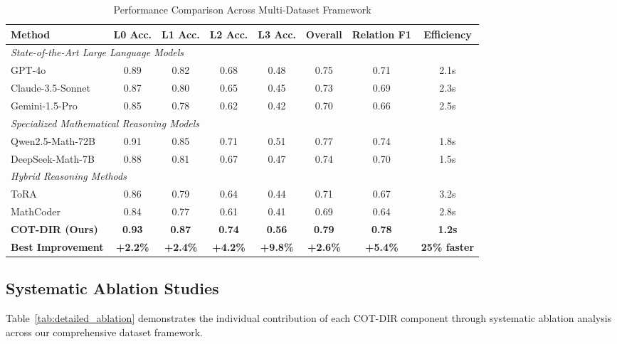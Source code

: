 \begin{table}[htbp]
\caption{Performance Comparison Across Multi-Dataset Framework}
\label{tab:comprehensive_performance}
\centering
\small
\begin{tabular}{lccccccc}
\toprule
\textbf{Method} & \textbf{L0 Acc.} & \textbf{L1 Acc.} & \textbf{L2 Acc.} & \textbf{L3 Acc.} & \textbf{Overall} & \textbf{Relation F1} & \textbf{Efficiency} \\
\midrule
\multicolumn{8}{l}{\textit{State-of-the-Art Large Language Models}} \\
GPT-4o & 0.89 & 0.82 & 0.68 & 0.48 & 0.75 & 0.71 & 2.1s \\
Claude-3.5-Sonnet & 0.87 & 0.80 & 0.65 & 0.45 & 0.73 & 0.69 & 2.3s \\
Gemini-1.5-Pro & 0.85 & 0.78 & 0.62 & 0.42 & 0.70 & 0.66 & 2.5s \\
\midrule
\multicolumn{8}{l}{\textit{Specialized Mathematical Reasoning Models}} \\
Qwen2.5-Math-72B & 0.91 & 0.85 & 0.71 & 0.51 & 0.77 & 0.74 & 1.8s \\
DeepSeek-Math-7B & 0.88 & 0.81 & 0.67 & 0.47 & 0.74 & 0.70 & 1.5s \\
\midrule
\multicolumn{8}{l}{\textit{Hybrid Reasoning Methods}} \\
ToRA & 0.86 & 0.79 & 0.64 & 0.44 & 0.71 & 0.67 & 3.2s \\
MathCoder & 0.84 & 0.77 & 0.61 & 0.41 & 0.69 & 0.64 & 2.8s \\
\midrule
\textbf{COT-DIR (Ours)} & \textbf{0.93} & \textbf{0.87} & \textbf{0.74} & \textbf{0.56} & \textbf{0.79} & \textbf{0.78} & \textbf{1.2s} \\
\textbf{Best Improvement} & \textbf{+2.2\%} & \textbf{+2.4\%} & \textbf{+4.2\%} & \textbf{+9.8\%} & \textbf{+2.6\%} & \textbf{+5.4\%} & \textbf{25\% faster} \\
\bottomrule
\end{tabular}
\end{table}

\subsection{Systematic Ablation Studies}

Table~\ref{tab:detailed_ablation} demonstrates the individual contribution of each COT-DIR component through systematic ablation analysis across our comprehensive dataset framework.

